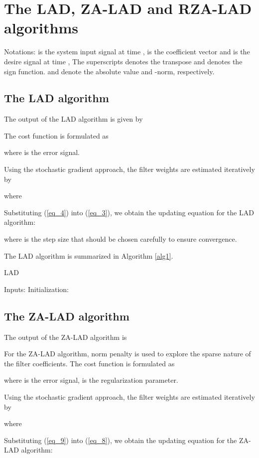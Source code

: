 \documentclass[conference]{IEEEtran}
\begin{document}
\section {The LAD, ZA-LAD and RZA-LAD algorithms}
\label{S2}
Notations:   is the system input signal at time ,  is the coefficient vector and   is the desire signal at time , The superscripts  denotes the transpose and  denotes the sign function.  and  denote the absolute value and  -norm, respectively.
\subsection {The LAD algorithm}
\label{S2-1}
The output of the LAD algorithm is given by

The cost function is formulated as
\setlength\arraycolsep{0.1em}

where  is the error signal.

Using the stochastic gradient approach, the filter weights are estimated iteratively by

where 

Substituting (\ref{eq_4}) into (\ref{eq_3}), we obtain the updating equation for the LAD algorithm:

where  is the step size that should be chosen carefully to ensure convergence.

The LAD algorithm is summarized in Algorithm \ref{alg1}.
\begin{algorithm}[!h]
\caption{LAD}
\label{alg1}
\begin{algorithmic}
\STATE   Inputs:  
\STATE  Initialization:  
\FOR{} 
\STATE 
\STATE 
\STATE 
\ENDFOR
\end{algorithmic}
\end{algorithm}
\subsection {The ZA-LAD algorithm}
\label{S2-2}
The output of the ZA-LAD algorithm is 

For the ZA-LAD algorithm,  norm penalty is used to explore the sparse nature of the filter coefficients. The cost function is formulated as
\setlength\arraycolsep{0.1em}

where  is the error signal,  is the regularization parameter.

Using the stochastic gradient approach, the filter weights are estimated iteratively by

where 

Substituting (\ref{eq_9}) into (\ref{eq_8}), we obtain the updating equation for the ZA-LAD algorithm:
\end{document}
